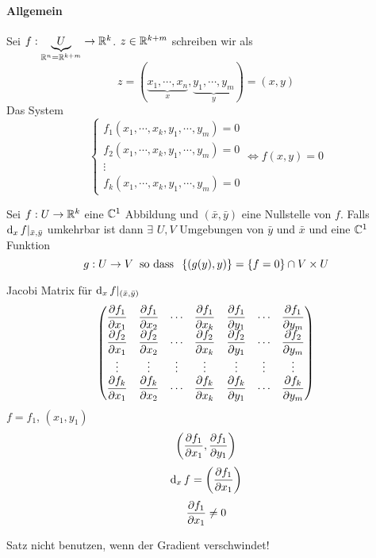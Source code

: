 \paragraph{Allgemein}
Sei $f:\underbrace{U}_{\mathbb{R}^n=\mathbb{R}^{k+m}}\rightarrow\mathbb{R}^k$. $z\in\mathbb{R}^{k+m}$ schreiben wir als 
\[z=(\underbrace{x_1,\cdots,x_n}_x, \underbrace{y_1,\cdots,y_m}_y)=(x,y)\]
Das System
\[\begin{cases}
  f_1(x_1,\cdots,x_k,y_1,\cdots,y_m)=0\\
  f_2(x_1,\cdots,x_k,y_1,\cdots,y_m)=0\\
  \vdots \\
  f_k(x_1,\cdots,x_k,y_1,\cdots,y_m)=0
\end{cases} \iff f(x,y)=0\]
\begin{Sat}
  Sei $f:U\rightarrow\mathbb{R}^k$ eine $\mathbb{C}^1$ Abbildung und $(\bar x, \bar y)$ eine Nullstelle von $f$. Falls $\operatorname{d}_xf|_{\bar x,\bar y}$ umkehrbar ist dann $\exists$ $U,V$ Umgebungen von $\bar y$ und $\bar x$ und eine $\mathbb{C}^1$ Funktion
  \[g:U\rightarrow V\hspace{2mm}\text{so dass}\hspace{2mm} \left\{ (g(y),y) \right\}=\left\{ f=0 \right\}\cap V\times U\]
\end{Sat}
\begin{Bem}
  Jacobi Matrix für $\operatorname{d}_xf|_{(\bar x, \bar y)}$
  \[ \begin{pmatrix}
    \dfrac{\partial f_1}{\partial x_1}&\dfrac{\partial f_1}{\partial x_2}&\cdots&\dfrac{\partial f_1}{\partial x_k}&\dfrac{\partial f_1}{\partial y_1}&\cdots&\dfrac{\partial f_1}{\partial y_m}\\
    \dfrac{\partial f_2}{\partial x_1}&\dfrac{\partial f_2}{\partial x_2}&\cdots&\dfrac{\partial f_2}{\partial x_k}&\dfrac{\partial f_2}{\partial y_1}&\cdots&\dfrac{\partial f_2}{\partial y_m}\\
    \vdots&\vdots&\vdots&\vdots&\vdots&\vdots&\vdots\\
    \dfrac{\partial f_k}{\partial x_1}&\dfrac{\partial f_k}{\partial x_2}&\cdots&\dfrac{\partial f_k}{\partial x_k}&\dfrac{\partial f_k}{\partial y_1}&\cdots&\dfrac{\partial f_k}{\partial y_m}\\
  \end{pmatrix}\]
  $f=f_1$, $(x_1,y_1)$
  \[\left( \dfrac{\partial f_1}{\partial x_1}, \dfrac{\partial f_1}{\partial y_1} \right)\]
  \[\operatorname{d}_xf=\left( \dfrac{\partial f_1}{\partial x_1} \right)\]
  \[\dfrac{\partial f_1}{\partial x_1}\neq 0\]
\end{Bem}
\begin{Bem}
  Satz nicht benutzen, wenn der Gradient verschwindet!
\end{Bem}
